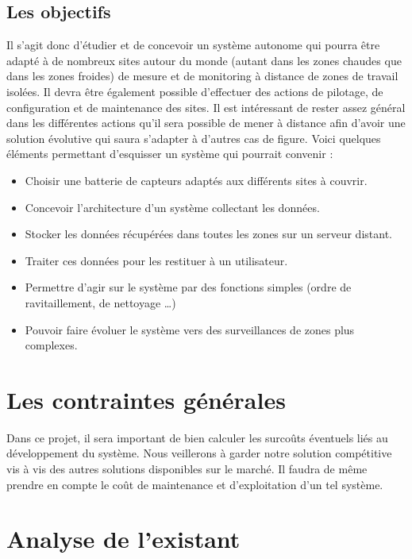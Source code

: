 \subsection{Les objectifs}

Il s'agit donc d'étudier et de concevoir un système autonome qui pourra être adapté à de nombreux sites autour du monde (autant dans les zones chaudes que dans les zones froides) de mesure et de monitoring à distance de zones de travail isolées. Il devra être également possible d'effectuer des actions de pilotage, de configuration et de maintenance des sites. Il est intéressant de rester assez général dans les différentes actions qu'il sera possible de mener à distance afin d'avoir une solution évolutive qui saura s'adapter à d'autres cas de figure.
Voici quelques éléments permettant d'esquisser un système qui pourrait convenir :

\begin{itemize}
\item Choisir une batterie de capteurs adaptés aux différents sites à couvrir.
\item Concevoir l'architecture d'un système collectant les données.
\item Stocker les données récupérées dans toutes les zones sur un serveur distant.
\item Traiter ces données pour les restituer à un utilisateur.
\item Permettre d'agir sur le système par des fonctions simples (ordre de ravitaillement, de nettoyage …)
\item Pouvoir faire évoluer le système vers des surveillances de zones plus complexes.
\end{itemize}
    
\section{Les contraintes générales}

Dans ce projet, il sera important de bien calculer les surcoûts éventuels liés au développement du système. Nous veillerons à garder notre solution compétitive vis à vis des autres solutions disponibles sur le marché. Il faudra de même prendre en compte le coût de maintenance et d'exploitation d'un tel système.

\section{Analyse de l'existant}

